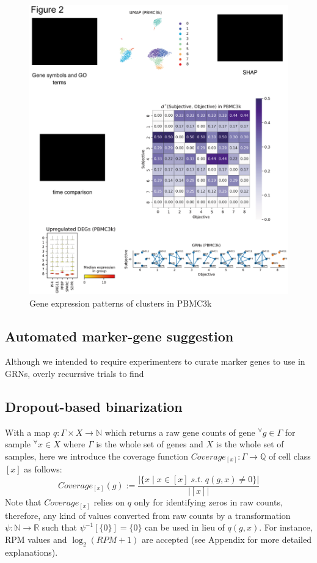 \documentclass{article}
\begin{document}
\begin{figure}[htb]
  \centering
  \includegraphics[scale=0.8]{./figs/exported/figure_2.png}
  \caption{Gene expression patterns of clusters in PBMC3k}
  \label{bc}
\end{figure}


\subsection*{Automated marker-gene suggestion}
Although we intended to require experimenters to curate marker genes to use
in GRNs, overly recurrsive trials to find 

\subsection*{Dropout-based binarization}
With a map $q: \Gamma\times X\rightarrow \mathbb{N}$ which returns a raw gene counts
of gene $^\forall g\in\Gamma$ for sample $^\forall x\in X$ where $\Gamma$ is the whole set of genes 
and $X$ is the whole set of samples, here we introduce the coverage function $Coverage_{[x]}: \Gamma\rightarrow\mathbb{Q}$ 
of cell class $[x]$ as follows:
\begin{equation}\label{coverage}
  Coverage_{[x]}(g):=\frac{
    |\{x\;|\;x\in[x]\;s.t.\;q(g,x)\neq 0\}|
  }{
    |[x]|
  }
\end{equation}
Note that $Coverage_{[x]}$ relies on $q$ only for identifying zeros in raw counts, therefore, 
any kind of values converted from raw counts by a transformation $\psi: \mathbb{N}\rightarrow\mathbb{R}$ 
such that $\psi^{-1}[\{0\}]=\{0\}$ can be used in lieu of $q(g, x)$. For instance, \ac{RPM} values 
and $\log_2(RPM+1)$ are accepted (see Appendix for more detailed explanations).
\end{document}
